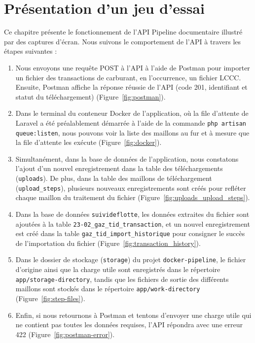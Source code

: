\chapter{Présentation d'un jeu d'essai}\label{ch:jeu-essai}

Ce chapitre présente le fonctionnement de l'API Pipeline documentaire illustré par des captures d'écran. Nous suivons le comportement de l'API à travers les étapes suivantes :

\begin{enumerate}
    \item Nous envoyons une requête POST à l'API à l'aide de Postman pour importer un fichier des transactions de carburant, en l'occurrence, un fichier LCCC. Ensuite, Postman affiche la réponse réussie de l'API (code 201, identifiant et statut du téléchargement) (Figure~\ref{fig:postman}).
    \item Dans le terminal du conteneur Docker de l'application, où la file d'attente de Laravel a été préalablement démarrée à l'aide de la commande \Verb|php artisan queue:listen|, nous pouvons voir la liste des maillons au fur et à mesure que la file d'attente les exécute (Figure~\ref{fig:docker}).
    \item Simultanément, dans la base de données de l'application, nous constatons l'ajout d'un nouvel enregistrement dans la table des téléchargements (\Verb|uploads|). De plus, dans la table des maillons de téléchargement (\Verb|upload_steps|), plusieurs nouveaux enregistrements sont créés pour refléter chaque maillon du traitement du fichier (Figure~\ref{fig:uploads_upload_steps}).
    \item Dans la base de données \Verb|suivideflotte|, les données extraites du fichier sont ajoutées à la table \Verb|23-02_gaz_tid_transaction|, et un nouvel enregistrement est créé dans la table \Verb|gaz_tid_import_historique| pour consigner le succès de l'importation du fichier (Figure~\ref{fig:transaction_history}).
    \item Dans le dossier de stockage (\Verb|storage|) du projet \Verb|docker-pipeline|, le fichier d'origine ainsi que la charge utile sont enregistrés dans le répertoire \Verb|app/storage-directory|, tandis que les fichiers de sortie des différents maillons sont stockés dans le répertoire \Verb|app/work-directory| (Figure~\ref{fig:step-files}).
    \item Enfin, si nous retournons à Postman et tentons d'envoyer une charge utile qui ne contient pas toutes les données requises, l'API répondra avec une erreur 422 (Figure~\ref{fig:postman-error}).
\end{enumerate}

